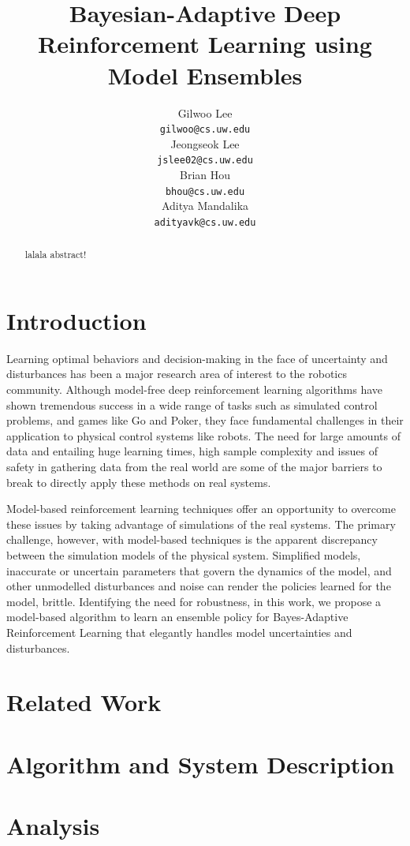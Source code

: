 \documentclass{article}
\title{Bayesian-Adaptive Deep Reinforcement Learning using Model Ensembles}
\author{
  Gilwoo Lee \\ \texttt{gilwoo@cs.uw.edu} \\
  \And
  Jeongseok Lee \\ \texttt{jslee02@cs.uw.edu} \\
  \And
  Brian Hou \\ \texttt{bhou@cs.uw.edu} \\
  \And
  Aditya Mandalika \\ \texttt{adityavk@cs.uw.edu} \\
}
\begin{document}
\maketitle

    \begin{abstract}
    lalala abstract!
    \end{abstract}

\section{Introduction}
Learning optimal behaviors and decision-making in the face of uncertainty and disturbances has been a major research area of interest to the robotics community. 
Although model-free deep reinforcement learning algorithms have shown tremendous success in a wide range of tasks such as simulated control problems, and games like Go and Poker, they face fundamental challenges in their application to physical control systems like robots. 
The need for large amounts of data and entailing huge learning times, high sample complexity and issues of safety in gathering data from the real world are some of the major barriers to break to directly apply these methods on real systems.

Model-based reinforcement learning techniques offer an opportunity to overcome these issues by taking advantage of simulations of the real systems. The primary challenge, however, with model-based techniques is the apparent discrepancy between the simulation models of the physical system. Simplified models, inaccurate or uncertain parameters that govern the dynamics of the model, and other unmodelled disturbances and noise can render the policies learned for the model, brittle. Identifying the need for robustness, in this work, we propose a model-based algorithm to learn an ensemble policy for Bayes-Adaptive Reinforcement Learning that elegantly handles model uncertainties and disturbances.



\section{Related Work}

\section{Algorithm and System Description}

\section{Analysis}
\end{document}

